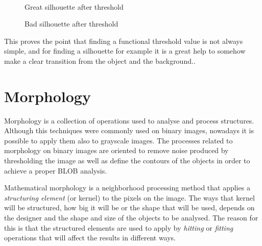 \begin{figure}[htbp]
\begin{minipage}[b]{0.45\textwidth}
\end{minipage} \\ %
\begin{minipage}[t]{0.45\textwidth}
\caption{Great silhouette after threshold} %
\label{fig:SimpleThresholdAfter}
\end{minipage} \hfill
\begin{minipage}[t]{0.45\textwidth}
\caption{Bad silhouette after threshold} %
\label{fig:ComplicatedThresholdAfter}
\end{minipage}
\end{figure}
 
This proves the point that finding a functional threshold value is not always simple, and for finding a silhouette for example it is a great help to somehow make a clear transition from the object and the background..

\section{Morphology}
Morphology is a collection of operations used to analyse and process structures. Although this techniques were commonly used on binary images, nowadays it is possible to apply them also to grayscale images.
The processes related to morphology on binary images are oriented to remove noise produced by thresholding the image as well as define the contours of the objects in order to achieve a proper BLOB analysis.

Mathematical morphology is a neighborhood processing method that applies a \textit{structuring element} (or kernel) to the pixels on the image. The ways that kernel will be structured, how big it will be or the shape that will be used, depends on the designer and the shape and size of the objects to be analysed. The reason for this is that the structured elements are used to apply by \textit{hitting} or \textit{fitting} operations that will affect the results in different ways.


